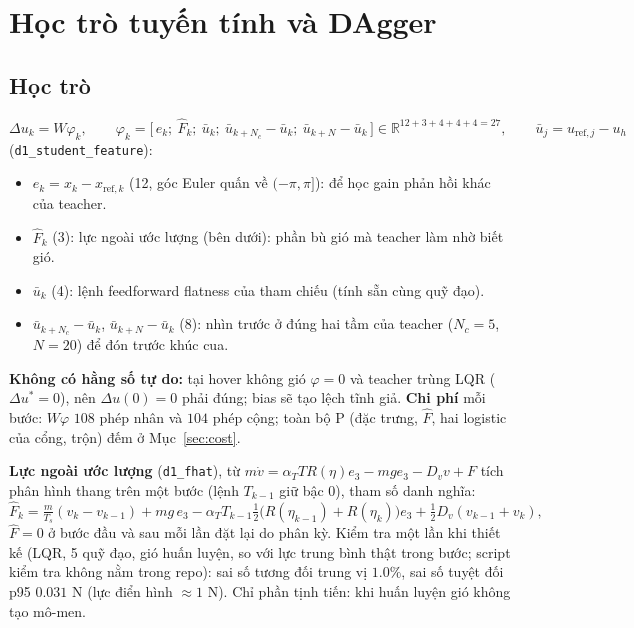 \documentclass[11pt]{article}
\newcommand{\R}{\mathbb{R}}
\begin{document}
\section{Học trò tuyến tính và DAgger}
\subsection{Học trò}
\[
\Delta u_k=W\varphi_k,\qquad
\varphi_k=\big[\,e_k;\ \hat F_k;\ \bar u_k;\ \bar u_{k+N_c}-\bar u_k;\ \bar u_{k+N}-\bar u_k\,\big]\in\R^{12+3+4+4+4=27},
\qquad \bar u_j=u_{\mathrm{ref},j}-u_h
\]
(\texttt{d1\_student\_feature}):
\begin{itemize}[leftmargin=1.4em,itemsep=1pt]
\item $e_k=x_k-x_{\mathrm{ref},k}$ (12, góc Euler quấn về $(-\pi,\pi]$): để học gain phản hồi khác của teacher.
\item $\hat F_k$ (3): lực ngoài ước lượng (bên dưới): phần bù gió mà teacher làm nhờ biết gió.
\item $\bar u_k$ (4): lệnh feedforward flatness của tham chiếu (tính sẵn cùng quỹ đạo).
\item $\bar u_{k+N_c}-\bar u_k$, $\bar u_{k+N}-\bar u_k$ (8): nhìn trước ở đúng hai tầm của teacher ($N_c{=}5$,
$N{=}20$) để đón trước khúc cua.
\end{itemize}
\textbf{Không có hằng số tự do:} tại hover không gió $\varphi=0$ và teacher trùng LQR ($\Delta u^*=0$), nên
$\Delta u(0)=0$ phải đúng; bias sẽ tạo lệch tĩnh giả. \textbf{Chi phí} mỗi bước: $W\varphi$ $108$ phép nhân và
$104$ phép cộng; toàn bộ P (đặc trưng, $\hat F$, hai logistic của cổng, trộn) đếm ở Mục~\ref{sec:cost}.

\textbf{Lực ngoài ước lượng} (\texttt{d1\_fhat}), từ $m\dot v=\alpha_T T R(\eta)e_3-mg e_3-D_v v+F$ tích phân
hình thang trên một bước (lệnh $T_{k-1}$ giữ bậc 0), tham số danh nghĩa:
\[
\hat F_k=\tfrac{m}{T_s}(v_k-v_{k-1})+mg\,e_3-\alpha_T T_{k-1}\tfrac12\big(R(\eta_{k-1})+R(\eta_k)\big)e_3
+\tfrac12D_v(v_{k-1}+v_k),
\]
$\hat F=0$ ở bước đầu và sau mỗi lần đặt lại do phân kỳ. Kiểm tra một lần khi thiết kế (LQR, 5 quỹ đạo, gió huấn
luyện, so với lực trung bình thật trong bước; script kiểm tra không nằm trong repo): sai số tương đối trung vị $1.0\%$, sai số tuyệt đối p95 $0.031$ N (lực điển hình
$\approx1$ N). Chỉ phần tịnh tiến: khi huấn luyện gió không tạo mô-men.
\end{document}
